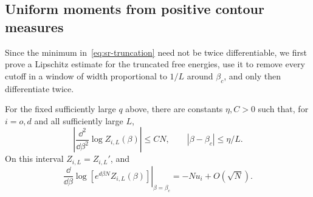 \subsection{Uniform moments from positive contour measures}
\label{subsubsec:sr-moments}

Since the minimum in~\eqref{eq:sr-truncation} need not be twice
differentiable, we first prove a Lipschitz estimate for the truncated
free energies, use it to remove every cutoff in a window of width
proportional to $1/L$ around $\beta_c$, and only then differentiate
twice.

\begin{lemma}
\label{lem:sr-restricted-derivatives}
For the fixed sufficiently large $q$ above, there are constants
$\eta,C>0$ such that, for $i=o,d$ and all sufficiently large $L$,
\begin{equation}
 \left|\frac{\dd^2}{\dd\beta^2}\log Z_{i,L}(\beta)\right|\le CN,
 \qquad |\beta-\beta_c|\le\eta/L.
 \label{eq:sr-restricted-second}
\end{equation}
On this interval $Z_{i,L}=Z_{i,L}'$, and
\begin{equation}
 \left.\frac{\dd}{\dd\beta}
 \log[e^{d\beta N}Z_{i,L}(\beta)]\right|_{\beta=\beta_c}
       =-Nu_i+O(\sqrt N).
 \label{eq:sr-restricted-center}
\end{equation}
\end{lemma}
